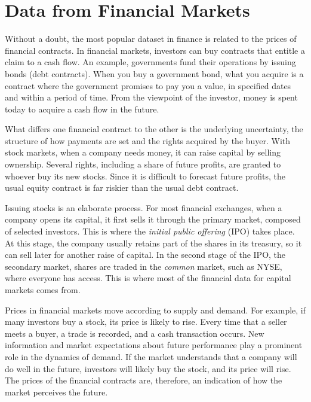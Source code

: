 \documentclass[11pt,]{book}
\begin{document}
\section{Data from Financial Markets}\label{data-from-financial-markets}

Without a doubt, the most popular dataset in finance is related to the
prices of financial contracts. In financial markets, investors can buy
contracts that entitle a claim to a cash flow. An example, governments
fund their operations by issuing bonds (debt contracts). When you buy a
government bond, what you acquire is a contract where the government
promises to pay you a value, in specified dates and within a period of
time. From the viewpoint of the investor, money is spent today to
acquire a cash flow in the future.

What differs one financial contract to the other is the underlying
uncertainty, the structure of how payments are set and the rights
acquired by the buyer. With stock markets, when a company needs money,
it can raise capital by selling ownership. Several rights, including a
share of future profits, are granted to whoever buy its new stocks.
Since it is difficult to forecast future profits, the usual equity
contract is far riskier than the usual debt contract.

Issuing stocks is an elaborate process. For most financial exchanges,
when a company opens its capital, it first sells it through the primary
market, composed of selected investors. This is where the \emph{initial
public offering} (IPO) takes place. At this stage, the company usually
retains part of the shares in its treasury, so it can sell later for
another raise of capital. In the second stage of the IPO, the secondary
market, shares are traded in the \emph{common} market, such as NYSE,
where everyone has access. This is where most of the financial data for
capital markets comes from.

Prices in financial markets move according to supply and demand. For
example, if many investors buy a stock, its price is likely to rise.
Every time that a seller meets a buyer, a trade is recorded, and a cash
transaction occurs. New information and market expectations about future
performance play a prominent role in the dynamics of demand. If the
market understands that a company will do well in the future, investors
will likely buy the stock, and its price will rise. The prices of the
financial contracts are, therefore, an indication of how the market
perceives the future.
\end{document}

